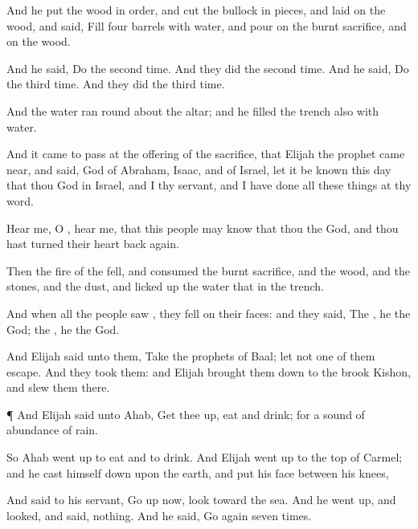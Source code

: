{And he
put the
wood in
order, and
cut the
bullock in pieces, and
laid
{} on the
wood, and
said,
Fill
four
barrels with
water, and
pour
{} on the burnt
sacrifice, and on the
wood.

And he
said, Do
{} the second
time. And they did
{} the second
time. And he
said, Do
{} the third
time. And they did
{} the third
time.

And the
water
ran round
about the
altar; and he
filled the
trench also with
water.

And it came to pass at
{} the
offering of the
{}
sacrifice, that
Elijah the
prophet came
near, and
said,
{}
God of
Abraham,
Isaac, and of
Israel, let it be
known this
day that thou
{}
God in
Israel, and
{} I
{} thy
servant, and
{} I have
done all these things at thy
word.

Hear me, O
{},
hear me, that this
people may
know that thou
{} the
{}
God, and
{} thou hast
turned their
heart
back
again.

Then the
fire of the
{}
fell, and
consumed the burnt
sacrifice, and the
wood, and the
stones, and the
dust, and licked
up the
water that
{} in the
trench.

And when all the
people
saw
{}, they
fell on their
faces: and they
said, The
{}, he
{} the
God; the
{}, he
{} the
God.

And
Elijah
said unto them,
Take the
prophets of
Baal; let not
one of them
escape. And they
took them: and
Elijah brought them
down to the
brook
Kishon, and
slew them there.


\par }{\PP {}¶ And
Elijah
said unto
Ahab, Get thee
up,
eat and
drink; for
{} a
sound of
abundance of
rain.

So
Ahab went
up to
eat and to
drink. And
Elijah went
up to the
top of
Carmel; and he cast himself
down upon the
earth, and
put his
face between his
knees,

And
said to his
servant, Go
up now,
look
toward the
sea. And he went
up, and
looked, and
said,
{}
nothing. And he
said, Go
again
seven
times.

}
